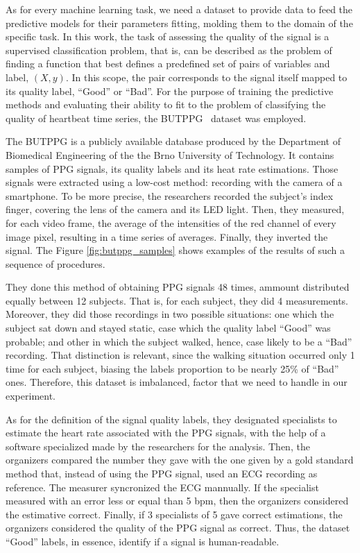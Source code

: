 As for every machine learning task, we need a dataset to provide data to feed the predictive models for their parameters fitting, molding them to the domain of the specific task. In this work, the task of assessing the quality of the signal is a supervised classification problem, that is, can be described as the problem of finding a function that best defines a predefined set of pairs of variables and label, $(X,y)$. In this scope, the pair corresponds to the signal itself mapped to its quality label, ``Good'' or ``Bad''. For the purpose of training the predictive methods and evaluating their ability to fit to the problem of classifying the quality of heartbeat time series, the \gls{BUTPPG}~\cite{butppg} dataset was employed.



The \gls{BUTPPG} is a publicly available database produced by the Department of Biomedical Engineering of the the Brno University of Technology. It contains samples of \gls{PPG} signals, its quality labels and its heat rate estimations. Those signals were extracted using a low-cost method: recording with the camera of a smartphone. To be more precise, the researchers recorded the subject's index finger, covering the lens of the camera and its \gls{LED} light. Then, they measured, for each video frame, the average of the intensities of the red channel of every image pixel, resulting in a time series of averages. Finally, they inverted the signal. The Figure \ref{fig:butppg_samples} shows examples of the results of such a sequence of procedures.  

They done this method of obtaining \gls{PPG} signals  48 times, ammount distributed equally between 12 subjects. That is, for each subject, they did 4 measurements. Moreover, they did those recordings in two possible situations: one which the subject sat down and stayed static, case which the quality label ``Good'' was probable; and other in which the subject walked, hence, case likely to be a ``Bad'' recording. That distinction is relevant, since the walking situation occurred only 1 time for each subject, biasing the labels proportion to be nearly 25\% of ``Bad'' ones. Therefore, this dataset is imbalanced, factor that we need to handle in our experiment.

As for the definition of the signal quality labels, they designated specialists to estimate the heart rate associated with the \gls{PPG} signals, with the help of a software specialized made by the researchers for the analysis. Then, the organizers compared the number they gave with the one given by a gold standard method that, instead of using the \gls{PPG} signal, used an ECG recording as reference. The measurer syncronized the ECG mannually. If the specialist measured with an error less or equal than 5 bpm, then the organizers considered the estimative correct. Finally, if 3 specialists of 5 gave correct estimations, the organizers considered the quality of the \gls{PPG} signal as correct. Thus, the dataset ``Good'' labels, in essence, identify if a signal is human-readable. 

